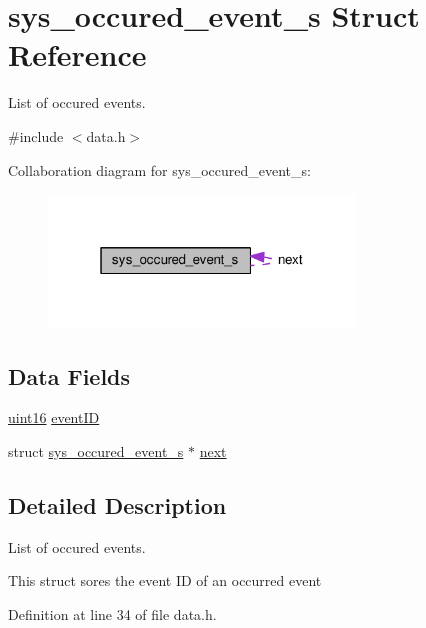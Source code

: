 \hypertarget{structsys__occured__event__s}{}\section{sys\+\_\+occured\+\_\+event\+\_\+s Struct Reference}
\label{structsys__occured__event__s}


List of occured events.  




{\ttfamily \#include $<$data.\+h$>$}



Collaboration diagram for sys\+\_\+occured\+\_\+event\+\_\+s\+:\nopagebreak
\begin{figure}[H]
\begin{center}
\leavevmode
\includegraphics[width=232pt]{d1/d19/structsys__occured__event__s__coll__graph}
\end{center}
\end{figure}
\subsection*{Data Fields}
\begin{DoxyCompactItemize}
\item 
\hyperlink{definitions_8h_a05f6b0ae8f6a6e135b0e290c25fe0e4e}{uint16} \hyperlink{structsys__occured__event__s_a2bc2b2ee398582222728db5ad4aea1de}{event\+I\+D}
\item 
struct \hyperlink{structsys__occured__event__s}{sys\+\_\+occured\+\_\+event\+\_\+s} $\ast$ \hyperlink{structsys__occured__event__s_a5279262bb3a0710e84ecf6199dbca28e}{next}
\end{DoxyCompactItemize}


\subsection{Detailed Description}
List of occured events. 

This struct sores the event I\+D of an occurred event 

Definition at line 34 of file data.\+h.




